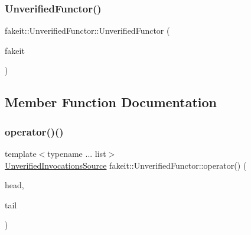 \mbox{\label{classfakeit_1_1UnverifiedFunctor_a5dcaec59e8d210db88b5600118e51426}} 
\subsubsection{\texorpdfstring{UnverifiedFunctor()}{UnverifiedFunctor()}\hspace{0.1cm}{\footnotesize\ttfamily [9/9]}}
{\footnotesize\ttfamily fakeit\+::\+Unverified\+Functor\+::\+Unverified\+Functor (\begin{DoxyParamCaption}\item[{\mbox{\hyperlink{structfakeit_1_1FakeitContext}{Fakeit\+Context}} \&}]{fakeit }\end{DoxyParamCaption})\hspace{0.3cm}{\ttfamily [inline]}}



\subsection{Member Function Documentation}
\mbox{\label{classfakeit_1_1UnverifiedFunctor_a460588cf559622fd0b9e9b30c5f7c9c9}} 
\subsubsection{\texorpdfstring{operator()()}{operator()()}\hspace{0.1cm}{\footnotesize\ttfamily [1/9]}}
{\footnotesize\ttfamily template$<$typename ... list$>$ \\
\mbox{\hyperlink{structfakeit_1_1UnverifiedInvocationsSource}{Unverified\+Invocations\+Source}} fakeit\+::\+Unverified\+Functor\+::operator() (\begin{DoxyParamCaption}\item[{const \mbox{\hyperlink{structfakeit_1_1ActualInvocationsSource}{Actual\+Invocations\+Source}} \&}]{head,  }\item[{const list \&...}]{tail }\end{DoxyParamCaption})\hspace{0.3cm}{\ttfamily [inline]}}

